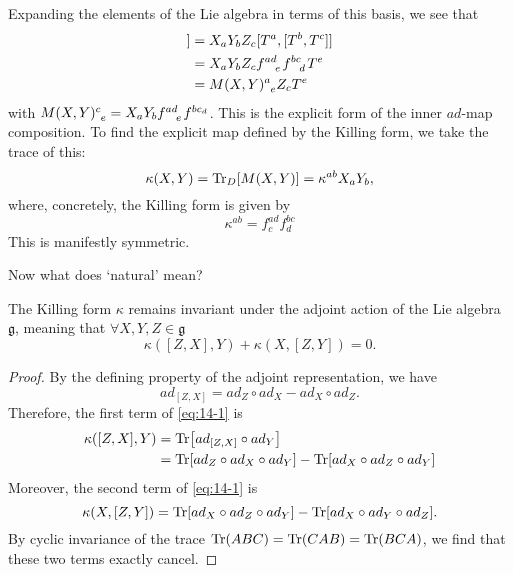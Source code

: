 Expanding the elements of the Lie algebra in terms of this basis, we see that
\begin{align}
  [X, [Y, Z]] &= X_a Y_b Z_c [T^a, [T^b, T^c]] \\
	      &= X_a Y_b Z_c f \indices{^{ad}_e} f \indices{^{bc}_d} T^e \\
	      &= M(X, Y) \indices{^a_e} Z_c T^e
\end{align}
with $M(X, Y) \indices{^c_e} = X_a Y_b f \indices{^{ad}_e} f^{bc_d}$. This is the explicit form of the inner $ad$-map composition.
To find the explicit map defined by the Killing form, we take the trace of this:
\begin{equation}
  \kappa(X, Y) = \Tr_D [M(X, Y)] = \kappa^{ab} X_a Y_b,
\end{equation}
where, concretely, the Killing form is given by
\begin{equation}
  \boxed{\kappa^{ab} = f^{ad}_c f^{bc}_d}
\end{equation}
This is manifestly symmetric.

Now what does `natural' mean? 
\begin{claim}
  The Killing form $\kappa$ remains invariant under the adjoint action of the Lie algebra $\mathfrak{g}$, meaning that $\forall X, Y, Z \in \mathfrak{g}$
  \begin{equation}
    \label{eq:14-1}
    \boxed{\kappa([Z, X], Y) + \kappa(X, [Z, Y]) = 0}.
  \end{equation}
\end{claim}
\begin{proof}
  By the defining property of the adjoint representation, we have
  \begin{equation}
    ad_{[Z, X]} = ad_Z \circ ad_X - ad_X \circ ad_Z.
  \end{equation}
  Therefore, the first term of \eqref{eq:14-1} is
  \begin{align}
    \kappa([Z, X], Y) &= \Tr[ad_{[Z, X]} \circ ad_Y] \\
		      &= \Tr[ad_Z \circ ad_X \circ ad_Y] - \Tr[ad_X \circ ad_Z \circ ad_Y]
  \end{align}
  Moreover, the second term of \eqref{eq:14-1} is
  \begin{equation}
    \kappa (X, [Z, Y]) = \Tr[ad_X \circ ad_Z \circ ad_Y] - \Tr[ad_X \circ ad_Y \circ ad_Z].
  \end{equation}
  By cyclic invariance of the trace $\Tr(ABC) = \Tr(CAB) = \Tr(BCA)$, we find that these two terms exactly cancel.
\end{proof}
